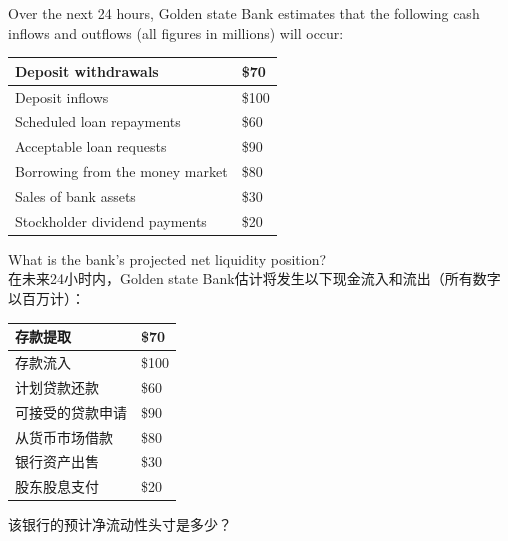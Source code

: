 \documentclass{article}
\newcounter{question} %
\begin{document}
\begin{question}
    Over the next 24 hours, Golden state Bank estimates that the following cash inflows and outflows (all figures in millions) will occur:

    \begin{table}[htbp]
        \centering
        \begin{tabular}{|l|l|}
            \hline
            Deposit withdrawals                & \$70  \\
            \hline
            Deposit inflows                    & \$100 \\
            \hline
            Scheduled loan repayments          & \$60  \\
            \hline
            Acceptable loan requests           & \$90  \\
            \hline
            Borrowing from the money market    & \$80  \\
            \hline
            Sales of bank assets               & \$30  \\
            \hline
            Stockholder dividend payments      & \$20  \\
            \hline
        \end{tabular}
    \end{table}
    What is the bank's projected net liquidity position?
    \\    在未来24小时内，Golden state Bank估计将发生以下现金流入和流出（所有数字以百万计）：

    \begin{table}[H]
        \centering
        \begin{tabular}{|l|l|}
            \hline
            存款提取                & \$70  \\
            \hline
            存款流入                    & \$100 \\
            \hline
            计划贷款还款          & \$60  \\
            \hline
            可接受的贷款申请           & \$90  \\
            \hline
            从货币市场借款    & \$80  \\
            \hline
            银行资产出售               & \$30  \\
            \hline
            股东股息支付      & \$20  \\
            \hline
        \end{tabular}
    \end{table}
    该银行的预计净流动性头寸是多少？
\end{question}
\end{document}
